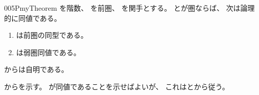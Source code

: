 \documentclass[index]{subfiles}
\begin{document}
\begin{myBlock}{005P}{myTheorem}
  を階数、
  を前圏、
  を関手とする。
  とが圏ならば、
  次は論理的に同値である。
  \begin{enumerate}
  \item \label{005P:0000} は前圏の同型である。
  \item \label{005P:0001} は弱圏同値である。
  \end{enumerate}
\end{myBlock}
\begin{myProof}
  からは自明である。

  からを示す。
  が同値であることを示せばよいが、
  これはとから従う。
\end{myProof}
\end{document}

